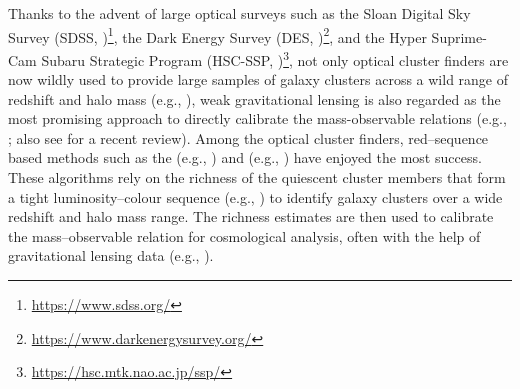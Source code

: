 \documentclass[fleqn,usenatbib,useAMS,english]{mnras}
\begin{document}
    Thanks to the advent of large optical surveys such as the Sloan Digital Sky Survey (SDSS,
    \citealt{York2000, SDSSDR7, SDSSDR16})\footnote{\url{https://www.sdss.org/}}, 
    the Dark Energy Survey (DES, \citealt{DES2016, Abbott2018,
    DES2021})\footnote{\url{https://www.darkenergysurvey.org/}}, and the Hyper Suprime-Cam Subaru
    Strategic Program (HSC-SSP,
    \citealt{Miyazaki2012, HSC-SSP, HSC-DR1,
    HSC-DR2})\footnote{\url{https://hsc.mtk.nao.ac.jp/ssp/}}, not only optical cluster finders
    are now wildly used to provide large samples of galaxy
    clusters across a wild range of redshift and halo mass (e.g., \citealt{Kepner1999,
    GladdersYee2000, Koester2007, Hao2010, Wen2012, Rykoff2014, Oguri2018, Aguena2021, Wen2021,
    Zou2021}),
    weak gravitational lensing is also regarded
    as the most promising approach to directly calibrate the mass-observable relations 
    (e.g., \citealt{Becker2011, vonderLinden2014, Applegate2014, Applegate2016, Okabe2016,
    Grandis2019}; also see \citealt{Umetsu2020b} for a recent review).
    Among the optical cluster finders, red--sequence based methods such as the 
    \redm{} (e.g., \citealt{Rykoff2014, Rozo2014, Rozo2015a, Rozo2015b, Rykoff2016}) and 
    \camira{} (e.g., \citealt{Oguri2014, Oguri2018}) have enjoyed the most success.
    These algorithms rely on the richness of the quiescent cluster members that form a 
    tight luminosity--colour sequence (e.g., \citealt{Bower1992, Kodama1997, Bell2004}) to
    identify galaxy clusters over a wide redshift and halo mass range.
    The richness estimates are then used to calibrate the mass--observable relation for 
    cosmological analysis, often with the help of gravitational lensing data (e.g.,
    \citealt{Baxter2016, Farahi2016, Simet2017, Melchior2017, Murata2018, McClintock2019}).
    
\end{document}
